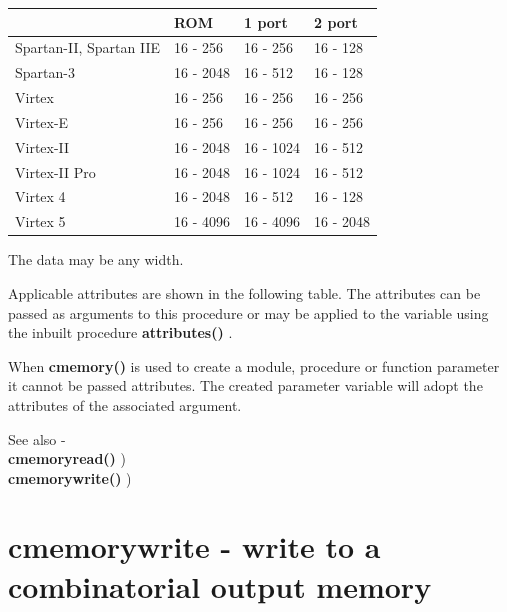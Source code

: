         \begin{tabular}{| l | l | l | l |} \hline
                                & ROM       & 1 port   &   2 port   \\ \hline \hline
        Spartan-II, Spartan IIE & 16 -  256 & 16 -  256 & 16 -  128 \\ \hline
        Spartan-3               & 16 - 2048 & 16 -  512 & 16 -  128 \\ \hline
        Virtex                  & 16 -  256 & 16 -  256 & 16 -  256 \\ \hline
        Virtex-E                & 16 -  256 & 16 -  256 & 16 -  256 \\ \hline
        Virtex-II               & 16 - 2048 & 16 - 1024 & 16 -  512 \\ \hline
        Virtex-II Pro           & 16 - 2048 & 16 - 1024 & 16 -  512 \\ \hline
        Virtex 4                & 16 - 2048 & 16 -  512 & 16 -  128 \\ \hline
        Virtex 5                & 16 - 4096 & 16 - 4096 & 16 - 2048 \\ \hline                                             
        \end{tabular}

        The data may be any width.
        
        Applicable attributes are shown in the following table. The
        attributes can be passed as arguments to this procedure or may be
        applied to the variable using the inbuilt procedure
        {\bf attributes()} .
        
        When {\bf cmemory()} is used to create a module, procedure or function
        parameter it cannot be passed attributes. The created parameter variable
        will adopt the attributes of the associated argument.
        
        See also - \\
        {\bf cmemoryread()} ) \\
        {\bf cmemorywrite()} ) \\



    \section{cmemorywrite - write to a combinatorial output memory}\label{sec:ipcmemorywrite}
        
